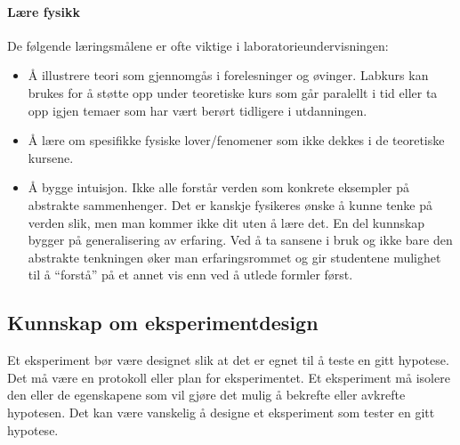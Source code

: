 \documentclass{article}
\begin{document}
\paragraph{Lære fysikk}
De følgende læringsmålene er ofte viktige i laboratorieundervisningen:
\begin{itemize}
  \item Å illustrere teori som gjennomgås i forelesninger og øvinger. Labkurs kan brukes for å støtte opp under teoretiske kurs som går paralellt i tid eller ta opp igjen temaer som har vært berørt tidligere i utdanningen.
  \item Å lære om spesifikke fysiske lover/fenomener som
    ikke dekkes i de teoretiske kursene.
  \item Å bygge intuisjon. Ikke alle forstår verden som konkrete eksempler på abstrakte sammenhenger. Det er kanskje fysikeres ønske å kunne tenke på verden slik, men man kommer ikke dit uten å lære det. En del kunnskap bygger på generalisering av erfaring. Ved å ta sansene i bruk og ikke bare den abstrakte tenkningen øker man erfaringsrommet og gir studentene mulighet til å “forstå” på et annet vis enn ved å utlede formler først.
\end{itemize}

\subsection{Kunnskap om eksperimentdesign}
Et eksperiment bør være designet slik at det er egnet til å teste en gitt hypotese.
Det må være en protokoll eller plan for eksperimentet.
Et eksperiment må isolere den eller de egenskapene som vil gjøre det mulig å bekrefte eller avkrefte hypotesen.
Det kan være vanskelig å designe et eksperiment som tester en gitt hypotese.
\end{document}
